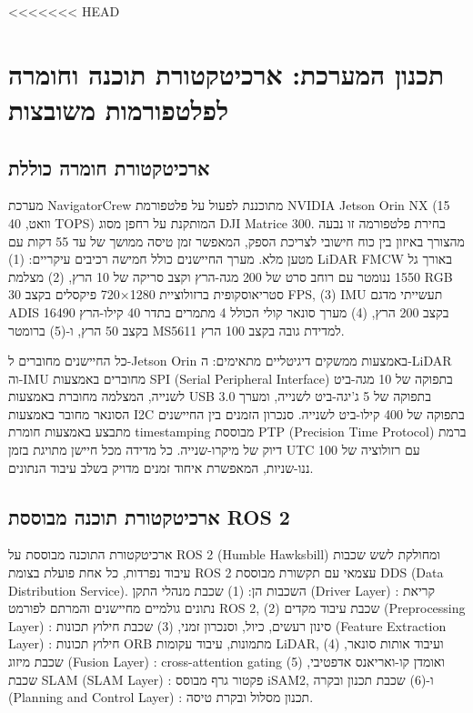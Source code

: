 <<<<<<< HEAD


\section{תכנון המערכת: ארכיטקטורת תוכנה וחומרה לפלטפורמות משובצות}
\label{sec:ch07_system_design}

\subsection{ארכיטקטורת חומרה כוללת}
\label{sec:ch07_hardware_arch}

מערכת NavigatorCrew מתוכננת לפעול על פלטפורמת NVIDIA Jetson Orin NX (15 וואט, 40 TOPS) המותקנת על רחפן מסוג DJI Matrice 300. בחירת פלטפורמה זו נבעה מהצורך באיזון בין כוח חישובי לצריכת הספק, המאפשר זמן טיסה ממושך של עד 55 דקות עם מטען מלא. מערך החיישנים כולל חמישה רכיבים עיקריים: (1) LiDAR FMCW באורך גל 1550 ננומטר עם רוחב סרט של 200 מגה-הרץ וקצב סריקה של 10 הרץ, (2) מצלמת RGB סטריאוסקופית ברזולוציית 1280×720 פיקסלים בקצב 30 FPS, (3) IMU תעשייתי מדגם ADIS 16490 בקצב 200 הרץ, (4) מערך סונאר קולי הכולל 4 מתמרים בתדר 40 קילו-הרץ בקצב 50 הרץ, ו-(5) ברומטר MS5611 למדידת גובה בקצב 100 הרץ.

כל החיישנים מחוברים ל-Jetson Orin באמצעות ממשקים דיגיטליים מתאימים: ה-LiDAR וה-IMU מחוברים באמצעות SPI (Serial Peripheral Interface) בתפוקה של 10 מגה-ביט לשנייה, המצלמה מחוברת באמצעות USB 3.0 בתפוקה של 5 ג'יגה-ביט לשנייה, ומערך הסונאר מחובר באמצעות I2C בתפוקה של 400 קילו-ביט לשנייה. סנכרון הזמנים בין החיישנים מתבצע באמצעות חומרת timestamping מבוססת PTP (Precision Time Protocol) ברמת דיוק של מיקרו-שנייה. כל מדידה מכל חיישן מתויגת בזמן UTC עם רזולוציה של 100 ננו-שניות, המאפשרת איחוד זמנים מדויק בשלב עיבוד הנתונים.

\subsection{ארכיטקטורת תוכנה מבוססת ROS 2}
\label{sec:ch07_software_arch}

ארכיטקטורת התוכנה מבוססת על ROS 2 (Humble Hawksbill) ומחולקת לשש שכבות עיבוד נפרדות, כל אחת פועלת בצומת ROS 2 עצמאי עם תקשורת מבוססת DDS (Data Distribution Service). השכבות הן: (1) שכבת מנהלי התקן (Driver Layer) : קריאת נתונים גולמיים מחיישנים והמרתם לפורמט ROS 2, (2) שכבת עיבוד מקדים (Preprocessing Layer) : סינון רעשים, כיול, וסנכרון זמני, (3) שכבת חילוץ תכונות (Feature Extraction Layer) : חילוץ תכונות ORB מתמונות, עיבוד עקומות LiDAR, ועיבוד אותות סונאר, (4) שכבת מיזוג (Fusion Layer) : cross-attention gating ואומדן קו-ואריאנס אדפטיבי, (5) שכבת SLAM (SLAM Layer) : פקטור גרף מבוסס iSAM2, ו-(6) שכבת תכנון ובקרה (Planning and Control Layer) : תכנון מסלול ובקרת טיסה.

